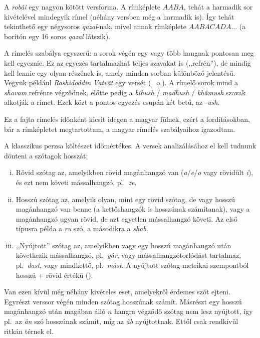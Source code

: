 A \emph{robâi} egy nagyon kötött versforma. A rímképlete $AABA$, tehát
a harmadik sor kivételével mindegyik rímel (néhány versben még a
harmadik is). Így tehát tekinthető egy négysoros \emph{qazal}-nak,
mivel annak rímképlete $AABACADA\dots$ (a borítón egy 16 soros
\emph{qazal} látszik).

A rímelés szabálya egyszerű: a sorok végén egy vagy több hangnak
pontosan meg kell egyeznie. Ez az egyezés tartalmazhat teljes szavakat
is (,,refrén''), de mindig kell lennie egy olyan részének is, amely
minden sorban különböző jelentésű. Vegyük például \emph{Rashidoddin
Vatvât} egy versét (\pageref{Vatvat}.~o.). A rímelő sorok mind
a \emph{shavam} refrénre végződnek, előtte pedig a \emph{bihush}
/ \emph{madhush} / \emph{khâmush} szavak alkotják a rímet. Ezek közt a
pontos egyezés csupán két betű, az \emph{-ush}.

Ez a fajta rímelés időnként kicsit idegen a magyar fülnek, ezért a
fordításokban, bár a rímképletet megtartottam, a magyar rímelés
szabályaihoz igazodtam.

A klasszikus perzsa költészet időmértékes. A versek analizálásához
el kell tudnunk dönteni a szótagok hosszát:

\begin{enumerate}[i)]
  \item Rövid szótag az, amelyikben rövid magánhangzó van
    (\emph{a}/\emph{e}/\emph{o} vagy rövidült \emph{i}), és ezt nem
    követi mássalhangzó, pl.~\emph{ze}.
  \item Hosszú szótag az, amelyik olyan, mint egy rövid szótag, de
    vagy hosszú magánhangzó van benne (a kettőshangzók is hosszúnak
    számítanak), vagy a magánhangzó ugyan rövid, de azt egyetlen mássalhangzó
    követi. Az első típusra példa a \emph{ru} szó, a másodikra a
    \emph{shab}.
  \item ,,Nyújtott'' szótag az, amelyikben vagy egy hosszú magánhangzó
    után következik mássalhangzó, pl.~\emph{yâr}, vagy
    mássalhangzótorlódást tartalmaz, pl.~\emph{dast}, vagy mindkettő,
    pl.~\emph{mâst}. A nyújtott szótag metrikai szempontból hosszú +
    rövid értékű (\metra{\m\b}).
\end{enumerate}

Van ezen kívül még néhány kivételes eset, amelyekről érdemes szót ejteni.
Egyrészt verssor végén minden szótag hosszúnak számít.
Másrészt egy hosszú magánhangzó után magában álló $n$ hangra végződő
szótag nem lesz nyújtott, így pl.~az \emph{ân} szó hosszúnak számít, míg
az \emph{âb} nyújtottnak. Ettől csak rendkívül ritkán térnek el.

